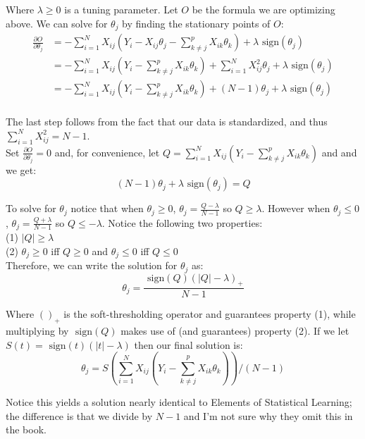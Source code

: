 \documentclass[12pt]{article}
\newcommand{\sgn}{\text{ sign}}
\begin{document}
Where $\lambda \geq 0$ is a tuning parameter.  Let $O$ be the formula we are optimizing above.  We can solve for $\theta_j$ by finding the stationary points of $O$:
\begin{equation}\begin{split}
	\frac{\partial O}{\partial \theta_j}
		& = -\sum\limits_{i=1}^N X_{ij}(Y_i - X_{ij}\theta_j - \sum\limits_{k \ne j}^p X_{ik}\theta_k) + \lambda \sgn(\theta_j) \\
		& = -\sum\limits_{i=1}^N X_{ij}(Y_i - \sum\limits_{k \ne j}^p X_{ik}\theta_k) + \sum\limits_{i=1}^NX_{ij}^2\theta_j + \lambda \sgn(\theta_j) \\
		& = -\sum\limits_{i=1}^N X_{ij}(Y_i - \sum\limits_{k \ne j}^p X_{ik}\theta_k) +(N-1)\theta_j + \lambda \sgn(\theta_j) \\
\end{split}\end{equation}

The last step follows from the fact that our data is standardized, and thus $\sum\limits_{i=1}^NX_{ij}^2 = N-1$.  \\

Set $\frac{\partial O}{\partial \theta_j}=0$ and, for convenience, let $Q = \sum\limits_{i=1}^N X_{ij}(Y_i - \sum\limits_{k \ne j}^p X_{ik}\theta_k)$ and and we get:
	$$(N-1)\theta_j + \lambda\sgn(\theta_j) = Q$$

To solve for $\theta_j$ notice that when $\theta_j \geq 0$, $\theta_j=\frac{Q-\lambda}{N-1}$ so $Q \geq \lambda$.  However when $\theta_j \leq 0$, $\theta_j=\frac{Q+\lambda}{N-1}$ so $Q \leq -\lambda$.  Notice the following two properties: \\
	\hspace*{1cm} (1) $|Q| \geq \lambda$ \\
	\hspace*{1cm} (2) $\theta_j \geq 0$ iff $Q \geq 0$ and $\theta_j \leq 0$ iff $Q \leq 0$ \\

Therefore, we can write the solution for $\theta_j$ as:
	$$\theta_j = \frac{\sgn(Q)(|Q|-\lambda)_+}{N-1}$$

Where $()_+$ is the soft-thresholding operator and guarantees property (1), while multiplying by $\sgn(Q)$ makes use of (and guarantees) property (2).  If we let\cite{ht} $S(t) = \sgn(t)(|t|-\lambda)$ then our final solution is:
	$$\theta_j = S\left(\sum\limits_{i=1}^N X_{ij}(Y_i - \sum\limits_{k \ne j}^p X_{ik}\theta_k)\right)/(N-1)$$

Notice this yields a solution nearly identical to Elements of Statistical Learning\cite{ht}; the difference is that we divide by $N-1$ and I'm not sure why they omit this in the book.  
\end{document}
